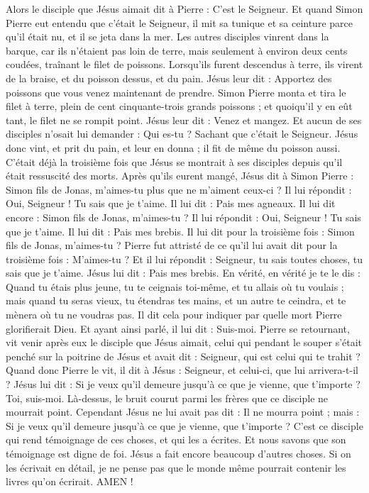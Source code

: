 \begin{multicols}{2}
Alors le disciple que Jésus aimait dit à Pierre : C'est le Seigneur. Et quand Simon Pierre eut entendu que c'était le Seigneur, il mit sa tunique et sa ceinture parce qu'il était nu, et il se jeta dans la mer.
Les autres disciples vinrent dans la barque, car ils n'étaient pas loin de terre, mais seulement à environ deux cents coudées, traînant le filet de poissons.
Lorsqu'ils furent descendus à terre, ils virent de la braise, et du poisson dessus, et du pain.
Jésus leur dit : Apportez des poissons que vous venez maintenant de prendre.
Simon Pierre monta et tira le filet à terre, plein de cent cinquante-trois grands poissons ; et quoiqu'il y en eût tant, le filet ne se rompit point.
Jésus leur dit : Venez et mangez. Et aucun de ses disciples n'osait lui demander : Qui es-tu ? Sachant que c'était le Seigneur.
Jésus donc vint, et prit du pain, et leur en donna ; il fit de même du poisson aussi.
C'était déjà la troisième fois que Jésus se montrait à ses disciples depuis qu'il était ressuscité des morts.
Après qu'ils eurent mangé, Jésus dit à Simon Pierre : Simon fils de Jonas, m'aimes-tu plus que ne m'aiment ceux-ci ? Il lui répondit : Oui, Seigneur ! Tu sais que je t'aime. Il lui dit : Pais mes agneaux.
Il lui dit encore : Simon fils de Jonas, m'aimes-tu ? Il lui répondit : Oui, Seigneur ! Tu sais que je t'aime. Il lui dit : Pais mes brebis.
Il lui dit pour la troisième fois : Simon fils de Jonas, m'aimes-tu ? Pierre fut attristé de ce qu'il lui avait dit pour la troisième fois : M'aimes-tu ? Et il lui répondit : Seigneur, tu sais toutes choses, tu sais que je t'aime. Jésus lui dit : Pais mes brebis.
En vérité, en vérité je te le dis : Quand tu étais plus jeune, tu te ceignais toi-même, et tu allais où tu voulais ; mais quand tu seras vieux, tu étendras tes mains, et un autre te ceindra, et te mènera où tu ne voudras pas.
Il dit cela pour indiquer par quelle mort Pierre glorifierait Dieu. Et ayant ainsi parlé, il lui dit : Suis-moi.
Pierre se retournant, vit venir après eux le disciple que Jésus aimait, celui qui pendant le souper s'était penché sur la poitrine de Jésus et avait dit : Seigneur, qui est celui qui te trahit ?
Quand donc Pierre le vit, il dit à Jésus : Seigneur, et celui-ci, que lui arrivera-t-il ?
Jésus lui dit : Si je veux qu'il demeure jusqu'à ce que je vienne, que t'importe ? Toi, suis-moi.
Là-dessus, le bruit courut parmi les frères que ce disciple ne mourrait point. Cependant Jésus ne lui avait pas dit : Il ne mourra point ; mais : Si je veux qu'il demeure jusqu'à ce que je vienne, que t'importe ?
C'est ce disciple qui rend témoignage de ces choses, et qui les a écrites. Et nous savons que son témoignage est digne de foi.
Jésus a fait encore beaucoup d'autres choses. Si on les écrivait en détail, je ne pense pas que le monde même pourrait contenir les livres qu'on écrirait. AMEN !
\PPE{}
\end{multicols}
